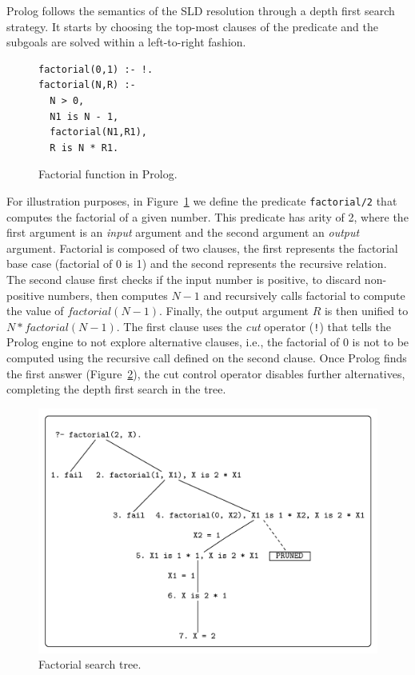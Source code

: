Prolog follows the semantics of the SLD resolution through a depth first search strategy.
It starts by choosing the top-most clauses of the predicate and the subgoals are solved
within a left-to-right fashion.

\begin{figure}[ht]
\begin{verbatim}
factorial(0,1) :- !.
factorial(N,R) :-
  N > 0,
  N1 is N - 1,
  factorial(N1,R1),
  R is N * R1.
\end{verbatim}
\caption{Factorial function in Prolog.}
\label{fig:factorial_prolog}
\end{figure}

For illustration purposes, in Figure~\ref{fig:factorial_prolog} we define the predicate \texttt{factorial/2} that
computes the factorial of a given number. This predicate has arity of 2, where the first argument is an
\textit{input} argument and the second argument an \textit{output} argument.
Factorial is composed of two clauses, the first represents the factorial base case (factorial of 0 is 1) and
the second represents the recursive relation. The second clause first checks if the input number
is positive, to discard non-positive numbers, then computes $N - 1$ and recursively
calls factorial to compute the value of $factorial(N-1)$. Finally, the output argument $R$ is then unified
to $N * factorial(N-1)$. The first clause uses the \textit{cut} operator (\texttt{!})
that tells the Prolog engine to not explore alternative clauses, i.e., the factorial of 0 is not to be
computed using the recursive call defined on the second clause.
Once Prolog finds the first answer (Figure~\ref{fig:factorial_tree}), the cut control operator disables further
alternatives, completing the depth first search in the tree.

\begin{figure}[ht]
  \centering
    \includegraphics[scale=0.6]{factorial.pdf}
  \caption{Factorial search tree.}
  \label{fig:factorial_tree}
\end{figure}

